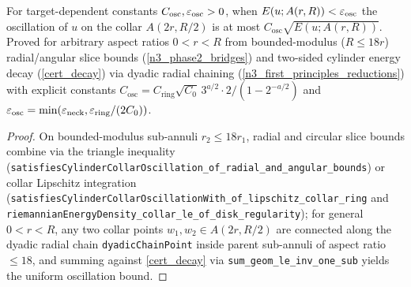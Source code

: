 \begin{theorem}
\label{cert_osc}
\leanok
{}
For target-dependent constants $C_{\mathrm{osc}},\varepsilon_{\mathrm{osc}}>0$, when $E(u;A(r,R))<\varepsilon_{\mathrm{osc}}$
the oscillation of $u$ on the collar $A(2r,R/2)$ is at most $C_{\mathrm{osc}}\sqrt{E(u;A(r,R))}$.
Proved for arbitrary aspect ratios $0<r<R$ from bounded-modulus ($R\le 18r$) radial/angular slice bounds
(\cref{n3_phase2_bridges}) and two-sided cylinder energy decay (\cref{cert_decay}) via dyadic radial
chaining (\cref{n3_first_principles_reductions}) with explicit constants
$C_{\mathrm{osc}}=C_{\mathrm{ring}}\sqrt{C_0}\,3^{a/2}\cdot 2/(1-2^{-a/2})$ and
$\varepsilon_{\mathrm{osc}}=\min(\varepsilon_{\mathrm{neck}},\varepsilon_{\mathrm{ring}}/(2C_0))$.
\end{theorem}
\begin{proof}\leanok On bounded-modulus sub-annuli $r_2\le 18r_1$, radial and circular slice bounds
combine via the triangle inequality (\texttt{satisfiesCylinderCollarOscillation\_of\_radial\_and\_angular\_bounds})
or collar Lipschitz integration (\texttt{satisfiesCylinderCollarOscillationWith\_of\_lipschitz\_collar\_ring}
and \texttt{riemannianEnergyDensity\_collar\_le\_of\_disk\_regularity}); for general $0<r<R$, any two
collar points $w_1,w_2\in A(2r,R/2)$ are connected along the dyadic radial chain
\texttt{dyadicChainPoint} inside parent sub-annuli of aspect ratio $\le 18$, and summing against
\cref{cert_decay} via \texttt{sum\_geom\_le\_inv\_one\_sub} yields the uniform oscillation bound.\end{proof}


